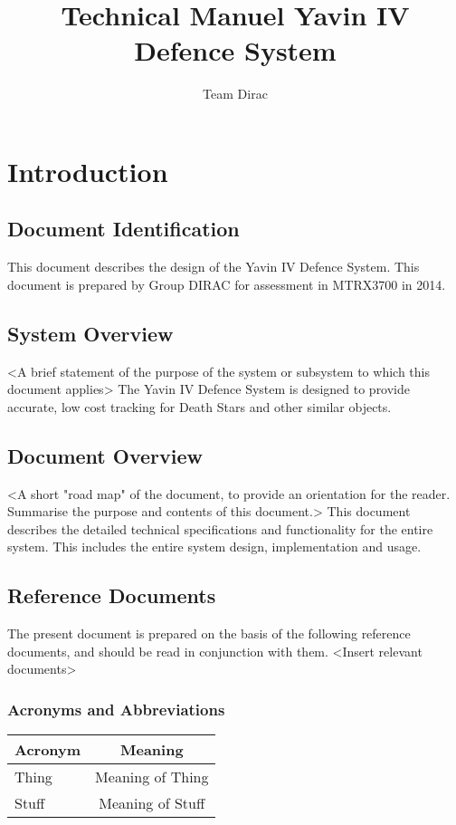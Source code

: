 \documentclass[]{report}
\title{Technical Manuel \newline Yavin IV Defence System}
\author{Team Dirac}
\begin{document}
\maketitle

\chapter{Introduction}
\section{Document Identification}
This document describes the design of the Yavin IV Defence System. This document is prepared by Group DIRAC for assessment in MTRX3700 in 2014.

\section{System Overview}
<A brief statement of the purpose of the system or subsystem to which this document applies>
The Yavin IV Defence System is designed to provide accurate, low cost tracking for Death Stars and other similar objects.

\section{Document Overview}
<A short "road map" of the document, to provide an orientation for the reader. Summarise the purpose and contents of this document.>
This document describes the detailed technical specifications and functionality for the entire system. This includes the entire system design, implementation and usage.

\section{Reference Documents}
The present document is prepared on the basis of the following reference documents, and should be read in conjunction with them.
	<Insert relevant documents>
\subsection{Acronyms and Abbreviations}


\begin{center}
	\begin{tabular}{ l | c }
		\hline
		Acronym & Meaning \\ \hline \hline
		Thing & Meaning of Thing \\ \hline
		Stuff & Meaning of Stuff \\
		\hline
	\end{tabular}
\end{center}
\end{document}
